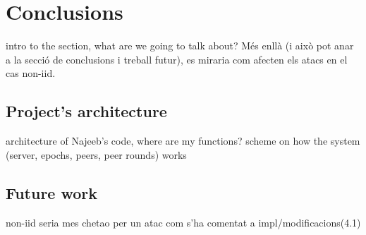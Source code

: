 \section{Conclusions}\label{sec:conclusions}
intro to the section, what are we going to talk about?
Més enllà (i això pot anar a la secció de conclusions i treball futur), es miraria com afecten els atacs en el cas non-iid.
\subsection{Project's architecture}
architecture of Najeeb's code, where are my functions?
scheme on how the system (server, epochs, peers, peer rounds) works

\subsection{Future work}
non-iid seria mes chetao per un atac com s'ha comentat a impl/modificacions(4.1)

\pagebreak